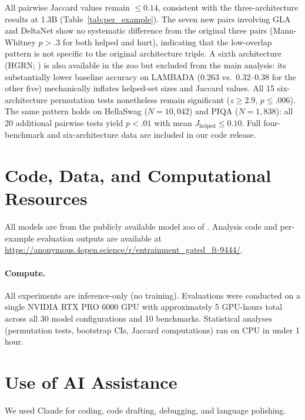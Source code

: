All pairwise Jaccard values remain $\leq 0.14$, consistent with the three-architecture results at 1.3B (Table~\ref{tab:per_example}). The seven new pairs involving GLA and DeltaNet show no systematic difference from the original three pairs (Mann-Whitney $p > .3$ for both helped and hurt), indicating that the low-overlap pattern is not specific to the original architecture triple. A sixth architecture (HGRN; \citealp{qin2023hierarchically}) is also available in the zoo but excluded from the main analysis: its substantially lower baseline accuracy on LAMBADA (0.263 vs.\ 0.32--0.38 for the other five) mechanically inflates helped-set sizes and Jaccard values. All 15 six-architecture permutation tests nonetheless remain significant ($z \geq 2.9$, $p \leq .006$). The same pattern holds on HellaSwag ($N = 10{,}042$) and PIQA ($N = 1{,}838$): all 20 additional pairwise tests yield $p < .01$ with mean $J_{\text{helped}} \leq 0.10$. Full four-benchmark and six-architecture data are included in our code release.

\section{Code, Data, and Computational Resources}
\label{app:code_data}

All models are from the publicly available model zoo of \citet{wang2025hybrid}. Analysis code and per-example evaluation outputs are available at \url{https://anonymous.4open.science/r/entrainment_gated_ft-9444/}.

\paragraph{Compute.} All experiments are inference-only (no training). Evaluations were conducted on a single NVIDIA RTX PRO 6000 GPU with approximately 5 GPU-hours total across all 30 model configurations and 10 benchmarks. Statistical analyses (permutation tests, bootstrap CIs, Jaccard computations) ran on CPU in under 1 hour.

\section{Use of AI Assistance}

We used Claude for coding, code drafting, debugging, and language polishing.
